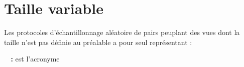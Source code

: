 

\section{Taille variable}

Les protocoles d'échantillonnage aléatoire de pairs peuplant des vues dont la
taille n'est pas définie au préalable a pour seul représentant :

\begin{asparadesc}
\item [\textbf{\SCAMP~\cite{ganesh2001scamp, ganesh2003peer} :}] est l'acronyme 
\end{asparadesc}


